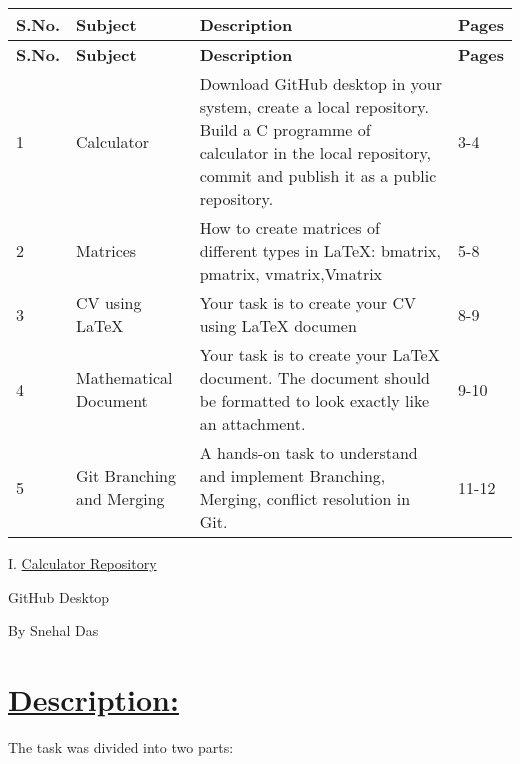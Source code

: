 \documentclass{article}
\begin{document}
\begin{center}
    
\large \begin{longtable}{|p{}|p{}|p{}|p{}|}
    \hline
    \textbf{\Large S.No.} & \textbf{\Large Subject} & \textbf{\Large Description} & \textbf{\Large Pages} \\
    \hline
    \endfirsthead
    \hline
    \textbf{\Large S.No.} & \textbf{\Large Subject} & \textbf{\Large Description} & \textbf{\Large Pages} \\
    \hline
    \endhead
    \hline
    1 & Calculator & Download GitHub desktop in your system, create a local repository. Build a C programme of calculator in the local repository, commit and publish it as a public repository. & 3-4 \\
    \hline
    2 & Matrices & How to create matrices of different types in LaTeX: bmatrix, pmatrix, vmatrix,Vmatrix & 5-8 \\
    \hline
    3 & CV using LaTeX & Your task is to create your CV using LaTeX documen & 8-9 \\
    \hline
    4 & Mathematical Document & Your task is to create your LaTeX document. 
    The document should be formatted to look exactly like an attachment. & 9-10 \\
    \hline
    5 & Git Branching and Merging & A hands-on task to understand and implement Branching, Merging, conflict resolution in Git. & 11-12 \\
    \hline
    
    
\end{longtable}
\end{center}
\newpage

\begin{center}
    \Huge I. \underline{Calculator Repository}
    \end{center}
    \vspace{1em}

    \begin{center}
        \Large GitHub Desktop
    \end{center}

    \vspace{0.4em}
    
    \begin{center}
        \large By Snehal Das
    \end{center}


\section{\underline{Description:}}
The task was divided into two parts: \vspace{0.2cm}\newline
\end{document}
